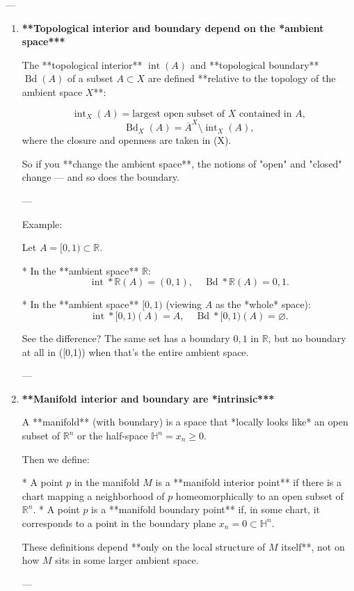 \documentclass[10pt,a4paper]{report}
\begin{document}
---
\begin{enumerate}
\item \textbf{ **Topological interior and boundary depend on the *ambient space***}

The **topological interior** $\operatorname{int}(A)$ and **topological boundary** $\operatorname{Bd}(A)$ of a subset $A\subset X$ are defined **relative to the topology of the ambient space $X$**:

$$
\operatorname{int}_X(A) = \text{largest open subset of } X \text{ contained in } A,
$$
$$
\operatorname{Bd}_X(A) = \overline{A}^X \setminus \operatorname{int}_X(A),
$$
where the closure and openness are taken in (X).

So if you **change the ambient space**, the notions of "open" and "closed" change — and so does the boundary.

---

Example:

Let $A = [0,1)\subset\mathbb{R}$.

* In the **ambient space** $\mathbb{R}$:
  $$
  \operatorname{int}*{\mathbb{R}}(A) = (0,1),\quad \operatorname{Bd}*{\mathbb{R}}(A) = {0,1}.
  $$

* In the **ambient space** $[0,1)$ (viewing $A$ as the *whole* space):
  $$
  \operatorname{int}*{[0,1)}(A) = A, \quad \operatorname{Bd}*{[0,1)}(A) = \varnothing.
  $$

See the difference? The same set has a boundary ${0,1}$ in $\mathbb{R}$, but no boundary at all in ([0,1)) when that’s the entire ambient space.

---

\item \textbf{ **Manifold interior and boundary are *intrinsic***}

A **manifold** (with boundary) is a space that *locally looks like* an open subset of $\mathbb{R}^n$ or the half-space $\mathbb{H}^n = {x_n\ge 0}$.

Then we define:

* A point $p$ in the manifold $M$ is a **manifold interior point** if there is a chart mapping a neighborhood of $p$ homeomorphically to an open subset of $\mathbb{R}^n$.
* A point $p$ is a **manifold boundary point** if, in some chart, it corresponds to a point in the boundary plane ${x_n=0}\subset\mathbb{H}^n$.

These definitions depend **only on the local structure of $M$ itself**, not on how $M$ sits in some larger ambient space.

---
\begin{itemize}


\end{itemize}
\end{enumerate}
\end{document}
